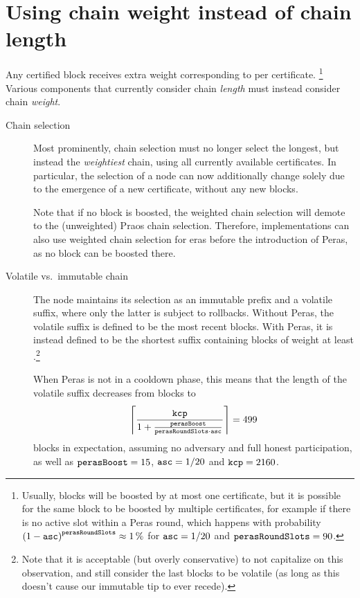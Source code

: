 \section{Using chain weight instead of chain length}\label{sec:weight not length}

Any certified block receives extra weight corresponding to \perasBoost{} per certificate.%
\footnote{Usually, blocks will be boosted by at most one certificate, but it is possible for the same block to be boosted by multiple certificates, for example if there is no active slot within a Peras round, which happens with probability ${(1-\mathtt{asc})}^{\mathtt{perasRoundSlots}} \approx \qty{1}{\percent}$ for $\mathtt{asc}=1/20$ and $\mathtt{perasRoundSlots}=90$.}
Various components that currently consider chain \emph{length} must instead consider chain \emph{weight}.

\begin{description}
\item[Chain selection]
  Most prominently, chain selection must no longer select the longest, but instead the \emph{weightiest} chain, using all currently available certificates.
  In particular, the selection of a node can now additionally change solely due to the emergence of a new certificate, without any new blocks.

  Note that if no block is boosted, the weighted chain selection will demote to the (unweighted) Praos chain selection.
  Therefore, implementations can also use weighted chain selection for eras before the introduction of Peras, as no block can be boosted there.
\item[Volatile vs.\ immutable chain]
  The node maintains its selection as an immutable prefix and a volatile suffix, where only the latter is subject to rollbacks.
  Without Peras, the volatile suffix is defined to be the \kcp{} most recent blocks.
  With Peras, it is instead defined to be the shortest suffix containing blocks of weight at least \kcp{}.\footnote{
    Note that it is acceptable (but overly conservative) to not capitalize on this observation, and still consider the last \kcp{} blocks to be volatile (as long as this doesn't cause our immutable tip to ever recede).}

  When Peras is not in a cooldown phase, this means that the length of the volatile suffix decreases from \kcp{} blocks to
  \[ \left\lceil \frac{\mathtt{kcp} }{1 + \frac{\mathtt{perasBoost}}{\mathtt{perasRoundSlots} \cdot \mathtt{asc}}} \right\rceil = 499 \]
  blocks in expectation, assuming no adversary and full honest participation, as well as $\mathtt{perasBoost} = 15$, $\mathtt{asc} = 1/20$ and $\mathtt{kcp} = 2160$.


\end{description}
